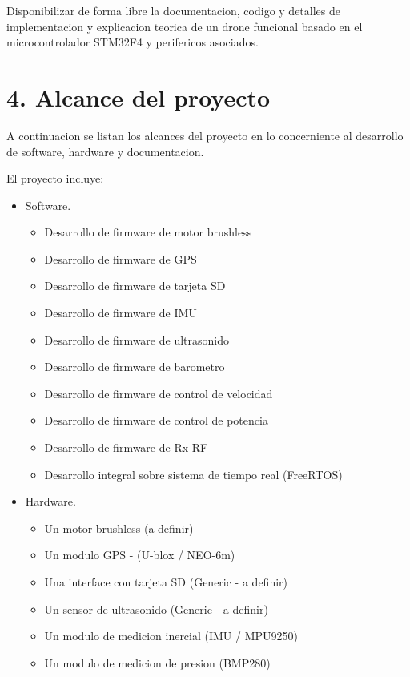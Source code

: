 \documentclass[
11pt, %
]{charter}
\begin{document}
	Disponibilizar de forma libre la documentacion, codigo y detalles de implementacion y explicacion teorica de un drone funcional basado en el microcontrolador STM32F4 y perifericos asociados. 


\section{4. Alcance del proyecto}
\label{sec:alcance}



	A continuacion se listan los alcances del proyecto en lo concerniente al desarrollo de software, hardware y documentacion. 

	El proyecto incluye:
	\begin{itemize}
		\item Software.
		 	\begin{itemize}
			      \item Desarrollo de firmware de motor brushless
			      \item Desarrollo de firmware de GPS
			      \item Desarrollo de firmware de tarjeta SD
			      \item Desarrollo de firmware de IMU 
			      \item Desarrollo de firmware de ultrasonido
			      \item Desarrollo de firmware de barometro 
			      \item Desarrollo de firmware de control de velocidad
			      \item Desarrollo de firmware de control de potencia
			      \item Desarrollo de firmware de Rx RF
			      \item Desarrollo integral sobre sistema de tiempo real (FreeRTOS) 
		      \end{itemize}
		\item Hardware.
		      \begin{itemize}
			      \item Un motor brushless (a definir)
			      \item Un modulo GPS - (U-blox / NEO-6m)
			      \item Una interface con tarjeta SD (Generic - a definir)
			      \item Un sensor de ultrasonido (Generic - a definir)
			      \item Un modulo de medicion inercial (IMU / MPU9250)
			      \item Un modulo de medicion de presion (BMP280)

\end{itemize}
\end{itemize}
\end{document}
